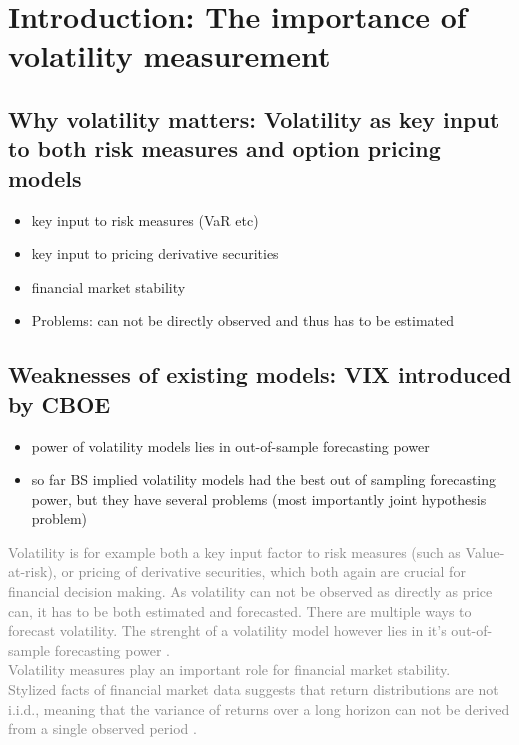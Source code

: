 
\section{Introduction: The importance of volatility measurement}
\subsection{Why volatility matters: Volatility as key input to both risk measures and option pricing models}
\begin{itemize}\itemsep0pt
\item key input to risk measures (VaR etc)
\item key input to pricing derivative securities
\item financial market stability
\item Problems: can not be directly observed and thus has to be estimated 
\end{itemize}

\subsection{Weaknesses of existing models: VIX introduced by CBOE}
\begin{itemize}\itemsep0pt
\item power of volatility models lies in out-of-sample forecasting power
\item so far BS implied volatility models had the best out of sampling forecasting power, but they have several problems (most importantly joint hypothesis problem) 
\end{itemize}

\textcolor{gray}{
Volatility is for example both a key input factor to risk measures (such as Value-at-risk), or pricing of derivative securities, which both again are crucial for financial decision making. As volatility can not be observed as directly as price can, it has to be both estimated and forecasted. There are multiple ways to forecast volatility. The strenght of a volatility model however lies in it's out-of-sample forecasting power \parencite{poon2003}. \\
Volatility measures play an important role for financial market stability.\\
Stylized facts of financial market data suggests that return distributions are not i.i.d., meaning that the variance of returns over a long horizon can not be derived from a single observed period \parencite{poon2003}. }
